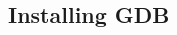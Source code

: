 \documentclass[class=book, crop=false]{standalone}
\begin{document}
\begin{CJK}{UTF8}{gbsn}

\chapter{Installing GDB}









\setcounter{section}{1}











\cleardoublepage

\end{CJK}
\end{document}
